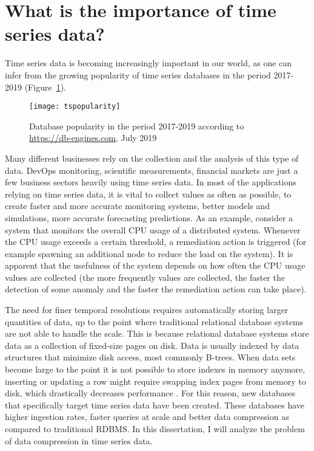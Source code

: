 \section{What is the importance of time series data?}
Time series data is becoming increasingly important in our world, as one can infer from the
growing popularity of time series databases in the period 2017-2019 (Figure~\ref{tspopularity}).

\begin{figure}
\begin{center}
\texttt{[image: tspopularity]}
\caption[tspopularity]{Database popularity in the period 2017-2019 according to
\url{https://db-engines.com}, July 2019}
\label{tspopularity}
\end{center}
\end{figure}

Many different businesses rely on the collection and the analysis of this type of data.
DevOps monitoring, scientific measurements, financial markets are just a few business sectors
heavily using time series data.  In most of the applications relying on time series data, it
is vital to collect values as often as possible, to create faster and more accurate monitoring
systems, better models and simulations, more accurate forecasting predictions. As an example,
consider a system that monitors the overall CPU usage of a distributed system. Whenever the
CPU usage exceeds a certain threshold, a remediation action is triggered (for example spawning
an additional node to reduce the load on the system). It is apparent that the usefulness of
the system depends on how often the CPU usage values are collected (the more frequently values are collected, the faster the detection of some anomaly and the faster the remediation action can take place).

The need for finer temporal resolutions requires automatically storing larger quantities of
data, up to the point where traditional relational database systems are not able to handle
the scale. This is because relational database systems store data as a collection of
fixed-size pages on disk. Data is usually indexed by data structures that minimize disk
access, most commonly B-trees. When data sets become large to the point it is not possible
to store indexes in memory anymore, inserting or updating a row might require swapping index
pages from memory to disk, which drastically decreases performance
\cite{Freedman2017Timeseries}. For this reason, new databases that specifically target
time series data have been created. These databases have higher ingestion rates, faster
queries at scale and better data compression as compared to traditional RDBMS. In this
dissertation, I will analyze the problem of data compression in time series data.

